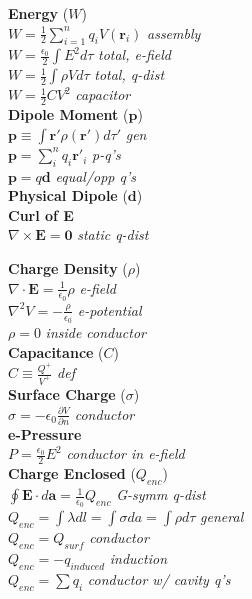\documentclass{article}
\begin{document}
\begin{multicols}{3}
\textbf{Energy} ($W$) \\
$W = \frac{1}{2}\sum_{i=1}^{n}q_{i}V(\mathbf{r}_{i})$ \textit{assembly} \\
$W = \frac{\epsilon_{0}}{2}\int E^{2}d\tau $ \textit{total, e-field} \\
$W = \frac{1}{2}\int\rho Vd\tau$ \textit{total, q-dist} \\
$W = \frac{1}{2}CV^{2}$ \textit{capacitor} \\

\textbf{Dipole Moment} ($\mathbf{p}$) \\
$\mathbf{p} \equiv \int{\mathbf{r}' \rho(\mathbf{r}') d\tau'}$ \textit{gen} \\
$\mathbf{p} = \sum_{i}^{n}q_{i}\mathbf{r'}_{i}$ \textit{p-q's} \\
$\mathbf{p} = q\mathbf{d}$ \textit{equal/opp q's} \\

\textbf{Physical Dipole} ($\mathbf{d}$) \\

\textbf{Curl of E} \\
$\nabla\times\mathbf{E} = \mathbf{0}$ \textit{static q-dist}

\textbf{Charge Density} ($\rho$) \\
$\nabla\cdot\mathbf{E} = \frac{1}{\epsilon_{0}}\rho$ \textit{e-field} \\
$\nabla^{2}V = -\frac{\rho}{\epsilon_{0}}$ \textit{e-potential} \\
$\rho = 0$ \textit{inside conductor} \\

\textbf{Capacitance} ($C$) \\
$C \equiv \frac{Q^{+}}{V^{+}}$ \textit{def} \\


\textbf{Surface Charge} ($\sigma$) \\
$\sigma = -\epsilon_{0}\frac{\partial V}{\partial n}$ \textit{conductor} \\

\textbf{e-Pressure} \\
$P = \frac{\epsilon_{0}}{2}E^{2}$ \textit{conductor in e-field} \\

\textbf{Charge Enclosed} ($Q_{enc}$) \\
$\oint\mathbf{E}\cdot d\mathbf{a} = \frac{1}{\epsilon_{0}}Q_{enc}$ \textit{G-symm q-dist} \\
$Q_{enc} = \int\lambda dl = \int\sigma da = \int\rho d\tau$ \textit{general} \\
$Q_{enc} = Q_{surf}$ \textit{conductor} \\
$Q_{enc} = -q_{induced}$ \textit{induction} \\
$Q_{enc} = \sum q_{i}$ \textit{conductor w/ cavity q's} \\


\end{multicols}
\end{document}
